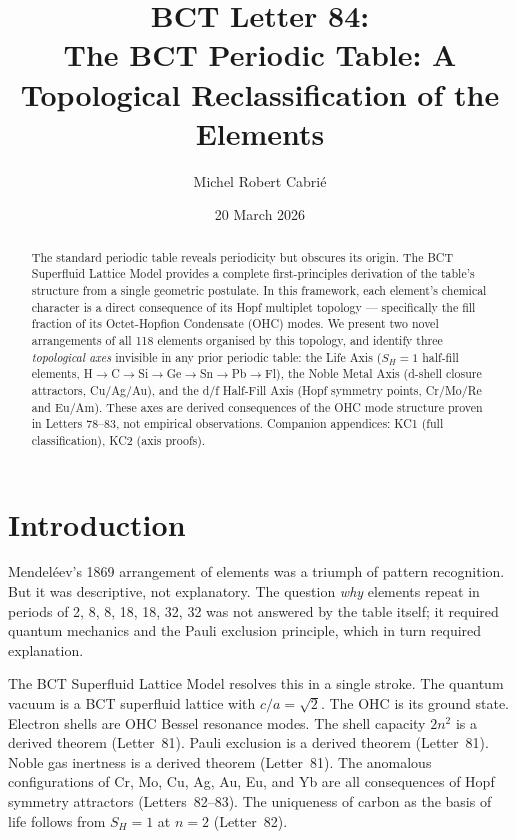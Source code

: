 \documentclass[aps,prl,twocolumn,superscriptaddress,floatfix]{revtex4-2}
\begin{document}
\title{BCT Letter 84:\\
The BCT Periodic Table: A Topological Reclassification of the Elements}

\author{Michel Robert Cabri\'{e}}
\date{20 March 2026}

\begin{abstract}
The standard periodic table reveals periodicity but obscures its origin.
The BCT Superfluid Lattice Model provides a complete first-principles
derivation of the table's structure from a single geometric postulate.
In this framework, each element's chemical character is a direct consequence
of its Hopf multiplet topology --- specifically the fill fraction of its
Octet-Hopfion Condensate (OHC) modes. We present two novel arrangements
of all 118 elements organised by this topology, and identify three
\textit{topological axes} invisible in any prior periodic table:
the Life Axis ($S_H = 1$ half-fill elements, H$\to$C$\to$Si$\to$Ge$\to$Sn$\to$Pb$\to$Fl),
the Noble Metal Axis (d-shell closure attractors, Cu/Ag/Au), and the
d/f Half-Fill Axis (Hopf symmetry points, Cr/Mo/Re and Eu/Am).
These axes are derived consequences of the OHC mode structure proven
in Letters 78--83, not empirical observations.
Companion appendices: KC1 (full classification), KC2 (axis proofs).
\end{abstract}

\maketitle

\section{Introduction}

Mendel\'eev's 1869 arrangement of elements was a triumph of pattern
recognition. But it was descriptive, not explanatory. The question
\textit{why} elements repeat in periods of 2, 8, 8, 18, 18, 32, 32
was not answered by the table itself; it required quantum mechanics
and the Pauli exclusion principle, which in turn required explanation.

The BCT Superfluid Lattice Model resolves this in a single stroke.
The quantum vacuum is a BCT superfluid lattice with $c/a = \sqrt{2}$.
The OHC is its ground state. Electron shells are OHC Bessel resonance
modes. The shell capacity $2n^2$ is a derived theorem (Letter~81).
Pauli exclusion is a derived theorem (Letter~81). Noble gas inertness
is a derived theorem (Letter~81). The anomalous configurations of
Cr, Mo, Cu, Ag, Au, Eu, and Yb are all consequences of Hopf symmetry
attractors (Letters~82--83). The uniqueness of carbon as the basis
of life follows from $S_H = 1$ at $n=2$ (Letter~82).
\end{document}

